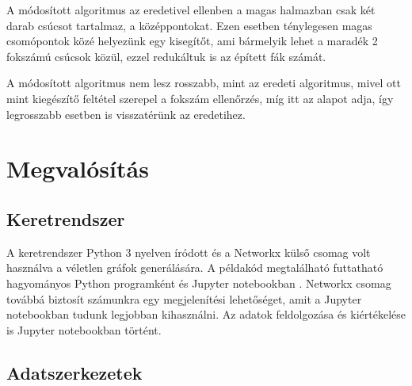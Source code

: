 \documentclass[12pt]{report}
\begin{document}
A módosított algoritmus az eredetivel ellenben a magas halmazban csak két darab csúcsot tartalmaz, a középpontokat.
Ezen esetben ténylegesen magas csomópontok közé helyezünk egy kisegítőt, ami bármelyik lehet a maradék 2 fokszámú csúcsok közül, ezzel redukáltuk is az épített fák számát.

A módosított algoritmus nem lesz rosszabb, mint az eredeti algoritmus, mivel ott mint kiegészítő feltétel szerepel a fokszám ellenőrzés, míg itt az alapot adja, így legrosszabb esetben is visszatérünk az eredetihez. 

\chapter{Megvalósítás}


\section{Keretrendszer}

A keretrendszer Python 3 \cite{noauthor_python_nodate} nyelven íródott és a Networkx \cite{noauthor_networkx_nodate} külső csomag volt használva a véletlen gráfok generálására.
A példakód megtalálható futtatható hagyományos Python programként és Jupyter notebookban \cite{noauthor_jupyter_nodate}.  
Networkx csomag továbbá biztosít számunkra egy megjelenítési lehetőséget, amit a Jupyter notebookban tudunk legjobban kihasználni.
Az adatok feldolgozása és kiértékelése is Jupyter notebookban történt. 

\section{Adatszerkezetek}
\end{document}
